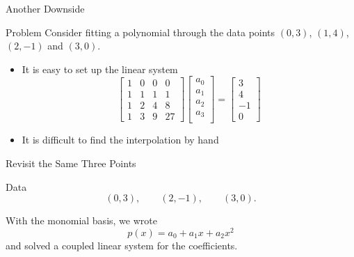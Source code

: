 \documentclass[10pt]{beamer}
\begin{document}
\begin{frame}{Another Downside}

\begin{block}{Problem}
    Consider fitting a polynomial through the data points $(0,3)$, $(1,4)$, $(2,-1)$ and $(3,0)$.
\end{block}

\begin{itemize}
    \item It is easy to set up the linear system 
\[
\begin{bmatrix}
1 & 0 & 0 &0 \\
1 & 1 & 1 & 1 \\
1 & 2 & 4 & 8 \\
1 & 3 & 9 & 27
\end{bmatrix}
\begin{bmatrix}
a_0 \\
a_1 \\
a_2 \\
a_3 \\
\end{bmatrix}
=
\begin{bmatrix}
3 \\
4 \\
-1 \\
0
\end{bmatrix}
\]
\item It is difficult to find the interpolation by hand
\end{itemize}
\end{frame}

\begin{frame}{Revisit the Same Three Points}
\begin{block}{Data}
\[
(0,3),\qquad (2,-1),\qquad (3,0).
\]
\end{block}
With the monomial basis, we wrote
\[
p(x)=a_0+a_1x+a_2x^2
\]
and solved a coupled linear system for the coefficients.


\end{frame}
\end{document}
